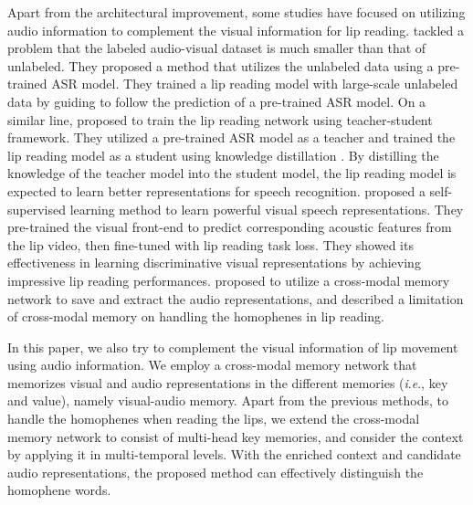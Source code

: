 \documentclass[letterpaper]{article} \usepackage{aaai22}  \usepackage{times}  \usepackage{helvet}  \usepackage{courier}  \usepackage[hyphens]{url}  \usepackage{graphicx} \urlstyle{rm} \def\UrlFont{\rm}  \usepackage{natbib}  \usepackage{caption} \DeclareCaptionStyle{ruled}{labelfont=normalfont,labelsep=colon,strut=off} \frenchspacing  \setlength{\pdfpagewidth}{8.5in}  \setlength{\pdfpageheight}{11in}  \usepackage{algorithm}
\newcommand{\ie}{\textit{i}.\textit{e}.}
\begin{document}
Apart from the architectural improvement, some studies have focused on utilizing audio information to complement the visual information for lip reading. \cite{afouras2020asrisall} tackled a problem that the labeled audio-visual dataset is much smaller than that of unlabeled. They proposed a method that utilizes the unlabeled data using a pre-trained ASR model. They trained a lip reading model with large-scale unlabeled data by guiding to follow the prediction of a pre-trained ASR model. On a similar line, \cite{zhao2020hearing, ren2021learningfromthemaster} proposed to train the lip reading network using teacher-student framework. They utilized a pre-trained ASR model as a teacher and trained the lip reading model as a student using knowledge distillation \cite{hinton2015distilling}. By distilling the knowledge of the teacher model into the student model, the lip reading model is expected to learn better representations for speech recognition. \cite{ma2021lira} proposed a self-supervised learning method to learn powerful visual speech representations. They pre-trained the visual front-end to predict corresponding acoustic features from the lip video, then fine-tuned with lip reading task loss. They showed its effectiveness in learning discriminative visual representations by achieving impressive lip reading performances. \cite{kim2021visualaudiomem,hong2021speechmem} proposed to utilize a cross-modal memory network to save and extract the audio representations, and \cite{kim2021cromm} described a limitation of cross-modal memory on handling the homophenes in lip reading.

In this paper, we also try to complement the visual information of lip movement using audio information. We employ a cross-modal memory network that memorizes visual and audio representations in the different memories (\ie, key and value), namely visual-audio memory. 
Apart from the previous methods, to handle the homophenes when reading the lips, we extend the cross-modal memory network to consist of multi-head key memories, and consider the context by applying it in multi-temporal levels. With the enriched context and candidate audio representations, the proposed method can effectively distinguish the homophene words.
\end{document}
